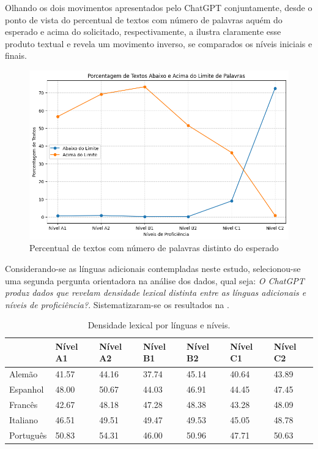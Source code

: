 \documentclass[portuguese]{textolivre}
\begin{document}
Olhando os dois movimentos apresentados pelo ChatGPT conjuntamente, desde o ponto de vista do percentual de textos com número de palavras aquém do esperado e acima do solicitado, respectivamente, a  ilustra claramente esse produto textual e revela um movimento inverso, se comparados os níveis iniciais e finais. 

\begin{figure}[h!]
    \centering
    \includegraphics[width=0.8\linewidth]{Fig7.png}
    \caption{Percentual de textos com número de palavras distinto do esperado}
    \label{fig7}
\end{figure}


Considerando-se as línguas adicionais contempladas neste estudo, selecionou-se uma segunda pergunta orientadora na análise dos dados, qual seja: \textit{O ChatGPT produz dados que revelam densidade lexical distinta entre as línguas adicionais e níveis de proficiência?}. Sistematizaram-se os resultados na . 

\begin{table}[h!]
\centering
\begin{threeparttable}
\caption{Densidade lexical por línguas e níveis.}
\label{tab04}
\begin{tabular}{l l l l l l l}
\toprule
& Nível A1 & Nível A2 & Nível B1 & Nível B2 & Nível C1 & Nível C2 \\
 \midrule
Alemão & 41.57 & 44.16 & 37.74 & 45.14 & 40.64 & 43.89 \\
Espanhol  & 48.00 & 50.67 & 44.03 & 46.91 & 44.45 & 47.45 \\
Francês & 42.67 & 48.18 & 47.28 & 48.38 & 43.28 & 48.09 \\
Italiano & 46.51 & 49.51 & 49.47 & 49.53 & 45.05 & 48.78 \\
Português & 50.83 & 54.31 & 46.00 & 50.96 & 47.71 & 50.63 \\
\bottomrule
\end{tabular}
\end{threeparttable}
\end{table}
\end{document}

